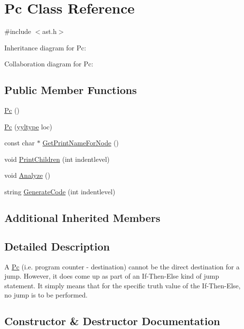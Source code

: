 \hypertarget{class_pc}{}\section{Pc Class Reference}
\label{class_pc}


{\ttfamily \#include $<$ast.\+h$>$}



Inheritance diagram for Pc\+:


Collaboration diagram for Pc\+:
\subsection*{Public Member Functions}
\begin{DoxyCompactItemize}
\item 
\hyperlink{class_pc_aef7314496cee3c1bd2c329aac4dc4f21}{Pc} ()
\item 
\hyperlink{class_pc_a9cda0e0530fc008372c70ff09532ea48}{Pc} (\hyperlink{structyyltype}{yyltype} loc)
\item 
const char $\ast$ \hyperlink{class_pc_aa1b66bab13f8d0a36a95369571630303}{Get\+Print\+Name\+For\+Node} ()
\item 
void \hyperlink{class_pc_ad44ccd9eecca2d6b41205abf80996412}{Print\+Children} (int indentlevel)
\item 
void \hyperlink{class_pc_a8376e5338c6f9c37363f1012722efef9}{Analyze} ()
\item 
string \hyperlink{class_pc_abd7a71b57da30b20ab9bb20662c9f663}{Generate\+Code} (int indentlevel)
\end{DoxyCompactItemize}
\subsection*{Additional Inherited Members}


\subsection{Detailed Description}
A \hyperlink{class_pc}{Pc} (i.\+e. program counter -\/ destination) cannot be the direct destination for a jump. However, it does come up as part of an If-\/\+Then-\/\+Else kind of jump statement. It simply means that for the specific truth value of the If-\/\+Then-\/\+Else, no jump is to be performed. 

\subsection{Constructor \& Destructor Documentation}
\mbox{\label{class_pc_aef7314496cee3c1bd2c329aac4dc4f21}} 
